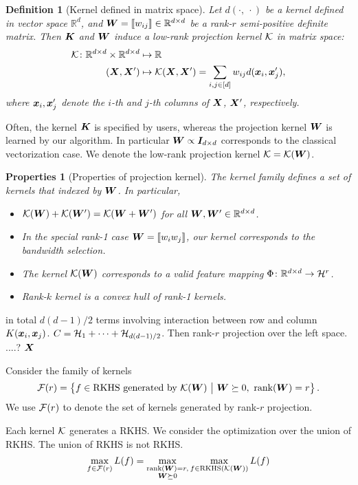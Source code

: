 \documentclass[12pt]{article}
\newtheorem{defn}{Definition}
\newtheorem{prop}{Properties}
\begin{document}
\begin{defn}[Kernel defined in matrix space] Let $d(\cdot,\ \cdot)$ be a kernel defined in vector space $\mathbb{R}^d$, and $\bm{W}=\llbracket w_{ij} \rrbracket\in\mathbb{R}^{d\times d}$ be a rank-$r$ semi-positive definite matrix. Then $\bm K$ and $\bm{W}$ induce a low-rank projection kernel $\mathcal{K}$ in matrix space:
\begin{align}
\mathcal{K} \colon \mathbb{R}^{d\times d} \times \mathbb{R}^{d\times d} &\mapsto \mathbb{R}\\
(\bm X,\bm X')&\mapsto\mathcal{K}(\bm X,\bm X')= \sum_{i,j\in[d]}w_{ij}d(\bm x_i,\bm x'_j),
\end{align}
where $\bm x_i, \bm x'_j$ denote the $i$-th and $j$-th columns of $\bm X$, $\bm X'$, respectively. 
\end{defn}

Often, the kernel $\bm K$ is specified by users, whereas the projection kernel $\bm{W}$ is learned by our algorithm. In particular $\bm{W}\propto \bm I_{d\times d}$ corresponds to the classical vectorization case. We denote the low-rank projection kernel $\mathcal{K}=\mathcal{K}(\bm{W})$. 

\begin{prop}[Properties of projection kernel]
The kernel family defines a set of kernels that indexed by $\bm{W}$. In particular, 
\begin{itemize}
\item $\mathcal{K}(\bm{W})+\mathcal{K}(\bm{W}')=\mathcal{K}(\bm{W}+\bm{W}')$ for all $\bm{W},\bm{W}' \in\mathbb{R}^{d\times d}$.
\item In the special rank-1 case $\bm{W}=\llbracket w_iw_j \rrbracket$, our kernel corresponds to the bandwidth selection. 
\item The kernel $\mathcal{K}(\bm{W})$ corresponds to a valid feature mapping $\Phi\colon \mathbb{R}^{d\times d}\to \mathcal{H}^r$.
\item Rank-$k$ kernel is a convex hull of rank-1 kernels. 
\end{itemize}
\end{prop}

in total $d(d-1)/2$ terms involving interaction between row and column $K(\bm x_i,\bm x_j)$. $C=\mathcal{H}_1+\cdots+\mathcal{H}_{d(d-1)/2}$. Then rank-$r$ projection over the left space. ....? 
$\bm X$

Consider the family of kernels
\[
\mathcal{F}(r)=\left\{ f\in\text{RKHS generated by $\mathcal{K}(\bm{W})$}\ \big| \ \bm{W} \succeq 0,\ \text{rank}(\bm{W})= r\right\}.
\]
We use $\mathcal{F}(r)$ to denote the set of kernels generated by rank-$r$ projection. 

Each kernel $\mathcal{K}$ generates a RKHS. We consider the optimization over the union of RKHS. The union of RKHS is not RKHS. 
\[
\max_{f\in\mathcal{F}(r)}L(f) = \max_{\substack{ \text{rank}(\bm{W})=r,\\ \bm{W} \succeq 0}}\max_{f\in \text{RKHS}(\mathcal{K}(\bm{W}))}L(f)
\]
\end{document}
